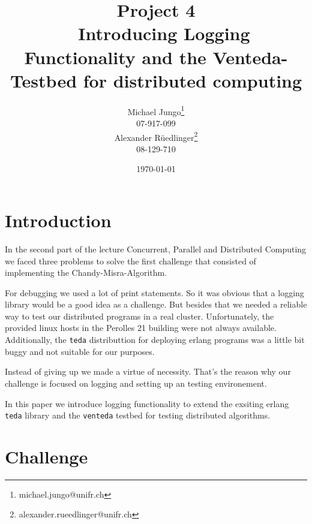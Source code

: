 \documentclass[10pt,a4wide]{article}
\begin{document}
\onehalfspacing 
\begin{titlepage}
\author{Michael Jungo\footnote{michael.jungo@unifr.ch} \\ 07-917-099 \\ Alexander Rüedlinger\footnote{alexander.rueedlinger@unifr.ch} \\ 08-129-710\\ }
\title{Project 4 \\ \ \vspace{0.5em} Introducing Logging Functionality and the Venteda-Testbed for distributed computing }

\date{\today}
\maketitle
\end{titlepage}

\tableofcontents
{} %
\newpage
{} %
\section{Introduction}
In the second part of the lecture Concurrent, Parallel and Distributed Computing we faced three problems to solve the first challenge that consisted of implementing the Chandy-Misra-Algorithm.

For debugging we used a lot of print statements. So it was obvious that a logging library would be a good idea as a challenge. But besides that we needed a reliable way to test our distributed programs in a real cluster. Unfortunately, the provided linux hosts in the Perolles 21 building were not always available. Additionally, the \texttt{teda} distributtion for deploying erlang programs was a little bit buggy and not suitable for our purposes.

Instead of giving up we made a virtue of necessity. That's the reason why our challenge is focused on logging and setting up an testing environement.

In this paper we introduce logging functionality to extend the exsiting erlang \texttt{teda} library and the \texttt{venteda} testbed for testing distributed algorithms.


\section{Challenge}
\end{document}
